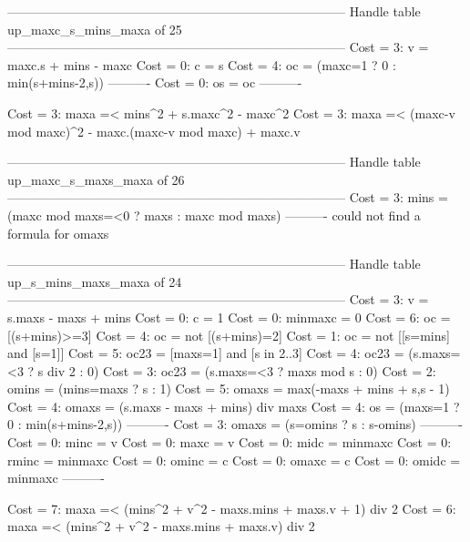 --------------------------------------------------------------------------------
Handle table up_maxc_s_mins_maxa of 25
--------------------------------------------------------------------------------
Cost =  3:  v  = maxc.s + mins - maxc
Cost =  0:  c  = s
Cost =  4:  oc = (maxc=1 ? 0 : min(s+mins-2,s))
----------
Cost =  0:  os = oc
----------

Cost =  3:  maxa =< mins^2 + s.maxc^2 - maxc^2
Cost =  3:  maxa =< (maxc-v mod maxc)^2 - maxc.(maxc-v mod maxc) + maxc.v

--------------------------------------------------------------------------------
Handle table up_maxc_s_maxs_maxa of 26
--------------------------------------------------------------------------------
Cost =  3:  mins  = (maxc mod maxs=<0 ? maxs : maxc mod maxs)
----------
could not find a formula for omaxs


--------------------------------------------------------------------------------
Handle table up_s_mins_maxs_maxa of 24
--------------------------------------------------------------------------------
Cost =  3:  v       = s.maxs - maxs + mins
Cost =  0:  c       = 1
Cost =  0:  minmaxc = 0
Cost =  6:  oc      = [(s+mins)>=3]
Cost =  4:  oc      = not [(s+mins)=2]
Cost =  1:  oc      = not [[s=mins] and [s=1]]
Cost =  5:  oc23    = [maxs=1] and [s in 2..3]
Cost =  4:  oc23    = (s.maxs=<3 ? s div 2 : 0)
Cost =  3:  oc23    = (s.maxs=<3 ? maxs mod s : 0)
Cost =  2:  omins   = (mins=maxs ? s : 1)
Cost =  5:  omaxs   = max(-maxs + mins + s,s - 1)
Cost =  4:  omaxs   = (s.maxs - maxs + mins) div maxs
Cost =  4:  os      = (maxs=1 ? 0 : min(s+mins-2,s))
----------
Cost =  3:  omaxs   = (s=omins ? s : s-omins)
----------
Cost =  0:  minc    = v
Cost =  0:  maxc    = v
Cost =  0:  midc    = minmaxc
Cost =  0:  rminc   = minmaxc
Cost =  0:  ominc   = c
Cost =  0:  omaxc   = c
Cost =  0:  omidc   = minmaxc
----------

Cost =  7:  maxa =< (mins^2 + v^2 - maxs.mins + maxs.v + 1) div 2
Cost =  6:  maxa =< (mins^2 + v^2 - maxs.mins + maxs.v) div 2
